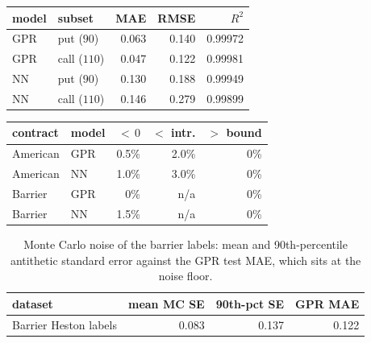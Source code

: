 \documentclass[12pt,a4paper]{article}
\begin{document}
\begin{table}[ht]
\centering
\footnotesize
\begin{minipage}[t]{0.49\textwidth}
\centering
\setlength{\tabcolsep}{4pt}
\begin{tabular}{llrrr}
\toprule
model & subset & MAE & RMSE & $R^2$ \\
\midrule
GPR & put ($90$)  & 0.063 & 0.140 & 0.99972 \\
GPR & call ($110$) & 0.047 & 0.122 & 0.99981 \\
NN  & put ($90$)  & 0.130 & 0.188 & 0.99949 \\
NN  & call ($110$) & 0.146 & 0.279 & 0.99899 \\
\bottomrule
\end{tabular}
\label{tab:putcall}
\end{minipage}\hfill
\begin{minipage}[t]{0.49\textwidth}
\centering
\setlength{\tabcolsep}{3pt}
\begin{tabular}{llrrr}
\toprule
contract & model & ${<}\,0$ & ${<}$ intr. & ${>}$ bound \\
\midrule
American & GPR & 0.5\% & 2.0\% & 0\% \\
American & NN  & 1.0\% & 3.0\% & 0\% \\
Barrier  & GPR & 0\%   & n/a   & 0\% \\
Barrier  & NN  & 1.5\% & n/a   & 0\% \\
\bottomrule
\end{tabular}
\label{tab:noarb}
\end{minipage}
\end{table}

\begin{table}[ht]
\centering
\footnotesize
\begin{tabular}{lrrr}
\toprule
dataset & mean MC SE & 90th-pct SE & GPR MAE \\
\midrule
Barrier Heston labels & 0.083 & 0.137 & 0.122 \\
\bottomrule
\end{tabular}
\caption{Monte Carlo noise of the barrier labels: mean and 90th-percentile
antithetic standard error against the GPR test MAE, which sits at the noise floor.}
\label{tab:mc_se}
\end{table}
\end{document}
